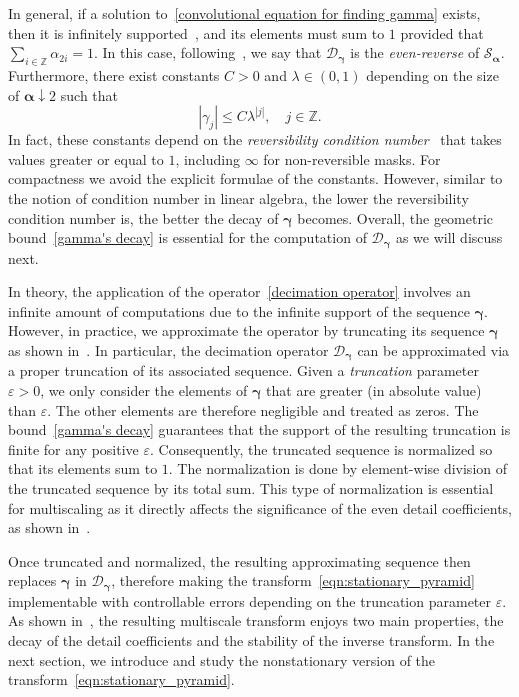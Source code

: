 \documentclass[11pt,a4paper]{article}
\theoremstyle{definition}
\begin{document}
In general, if a solution to~\eqref{convolutional equation for finding gamma} exists, then it is infinitely supported~\cite{grochenig2010wiener}, and its elements must sum to $1$ provided that $\sum_{i\in\mathbb{Z}}\alpha_{2i}=1$. In this case, following~\cite{dyn2021linear}, we say that $\mathcal{D}_{\boldsymbol{\gamma}}$ is the \emph{even-reverse} of $\mathcal{S}_{\boldsymbol{\alpha}}$. Furthermore, there exist constants $C>0$ and $\lambda\in(0,1)$ depending on the size of $\boldsymbol{\alpha}\downarrow2$ such that
\begin{equation} \label{gamma's decay}
    |\gamma_j| \leq C\lambda^{|j|}, \quad j \in \mathbb{Z}.
\end{equation}
In fact, these constants depend on the \emph{reversibility condition number}~\cite{mattar2023pseudo} that takes values greater or equal to $1$, including $\infty$ for non-reversible masks. For compactness we avoid the explicit formulae of the constants. However, similar to the notion of condition number in linear algebra, the lower the reversibility condition number is, the better the decay of $\boldsymbol{\gamma}$ becomes. Overall, the geometric bound~\eqref{gamma's decay} is essential for the computation of $\mathcal{D}_{\boldsymbol{\gamma}}$ as we will discuss next.

In theory, the application of the operator~\eqref{decimation operator} involves an infinite amount of computations due to the infinite support of the sequence $\boldsymbol{\gamma}$. However, in practice, we approximate the operator by truncating its sequence $\boldsymbol{\gamma}$ as shown in~\cite{mattar2023pyramid}. In particular, the decimation operator $\mathcal{D}_{\boldsymbol{\gamma}}$ can be approximated via a proper truncation of its associated sequence. Given a \emph{truncation} parameter $\varepsilon>0$, we only consider the elements of $\boldsymbol{\gamma}$ that are greater (in absolute value) than $\varepsilon$. The other elements are therefore negligible and treated as zeros. The bound~\eqref{gamma's decay} guarantees that the support of the resulting truncation is finite for any positive $\varepsilon$. Consequently, the truncated sequence is normalized so that its elements sum to $1$. The normalization is done by element-wise division of the truncated sequence by its total sum. This type of normalization is essential for multiscaling as it directly affects the significance of the even detail coefficients, as shown in~\cite{mattar2023pyramid}.

Once truncated and normalized, the resulting approximating sequence then replaces $\boldsymbol{\gamma}$ in $\mathcal{D}_{\boldsymbol{\gamma}}$, therefore making the transform~\eqref{eqn:stationary_pyramid} implementable with controllable errors depending on the truncation parameter $\varepsilon$. As shown in~\cite{mattar2023pyramid}, the resulting multiscale transform enjoys two main properties, the decay of the detail coefficients and the stability of the inverse transform. In the next section, we introduce and study the nonstationary version of the transform~\eqref{eqn:stationary_pyramid}.
\end{document}
